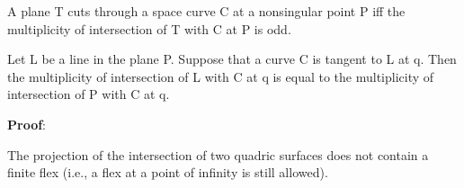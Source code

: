 \begin{conjecture}
\label{spacecutsthru}
A plane T cuts through a space curve C at a nonsingular point P iff
the multiplicity of intersection of T with C at P is odd.
\end{conjecture}
\begin{conjecture}
\label{inclusion}
Let L be a line in the plane P.
Suppose that a curve C is tangent to L at q.
Then the multiplicity of intersection of L with C at q is equal
to the multiplicity of intersection of P with C at q.
\end{conjecture}
{\bf Proof}:\nopagebreak \\
\begin{conjecture}
The projection of the intersection of two quadric surfaces does not
contain a finite flex (i.e., a flex at a point of infinity is still allowed).
\end{conjecture}
